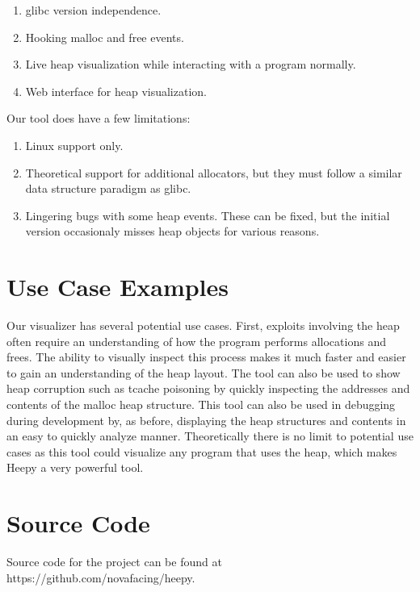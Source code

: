 \documentclass[12pt]{article}
\begin{document}
\begin{enumerate}
    \item glibc version independence.
    \item Hooking malloc and free events.
    \item Live heap visualization while interacting with a program normally.
    \item Web interface for heap visualization.
\end{enumerate}

\noindent Our tool does have a few limitations: \\

\begin{enumerate}
    \item Linux support only.
    \item Theoretical support for additional allocators, but they must follow a similar data structure paradigm as glibc.
    \item Lingering bugs with some heap events. These can be fixed, but the initial version occasionaly misses heap objects for various reasons.
\end{enumerate}

\section{Use Case Examples}

Our visualizer has several potential use cases. First, exploits involving the heap often require an understanding of how the program performs allocations and frees. The ability to visually inspect this process makes it much faster and easier to gain an understanding of the heap layout. The tool can also be used to show heap corruption such as tcache poisoning by quickly inspecting the addresses and contents of the malloc heap structure. This tool can also be used in debugging during development by, as before, displaying the heap structures and contents in an easy to quickly analyze manner. Theoretically there is no limit to potential use cases as this tool could visualize any program that uses the heap, which makes Heepy a very powerful tool. \\

\section{Source Code}

Source code for the project can be found at https://github.com/novafacing/heepy.
\end{document}
